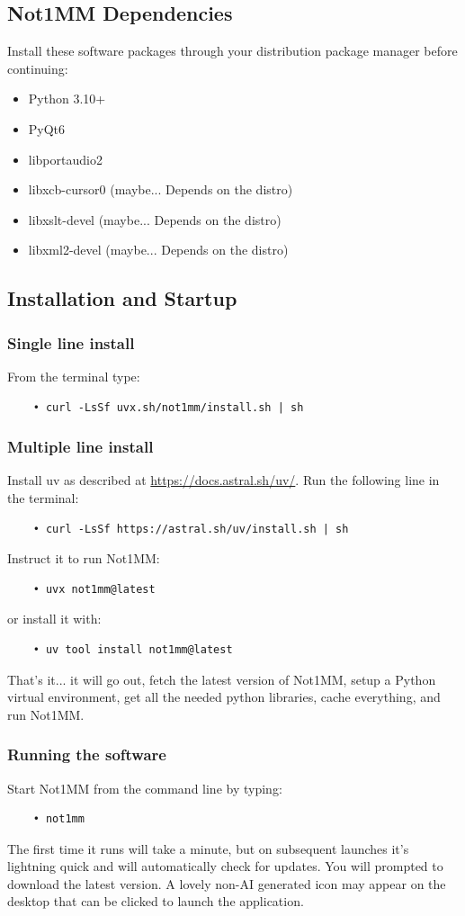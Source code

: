 \documentclass{article}
\begin{document}
\subsection{Not1MM Dependencies}
Install these software packages through your distribution package manager before continuing:
\begin{itemize}
    \item Python 3.10+
    \item PyQt6
    \item libportaudio2
    \item libxcb-cursor0 (maybe... Depends on the distro)
    \item libxslt-devel  (maybe... Depends on the distro)
    \item libxml2-devel  (maybe... Depends on the distro)
\end{itemize}

\subsection{Installation and Startup}

\subsubsection{Single line install}
From the terminal type:
\begin{verbatim}
    • curl -LsSf uvx.sh/not1mm/install.sh | sh
\end{verbatim}
\subsubsection{Multiple line install}
Install uv as described at \url{https://docs.astral.sh/uv/}. Run the following line in the terminal:
\begin{verbatim}
    • curl -LsSf https://astral.sh/uv/install.sh | sh
\end{verbatim}
Instruct it to run Not1MM:
\begin{verbatim}
    • uvx not1mm@latest
\end{verbatim}
or install it with:
\begin{verbatim}
    • uv tool install not1mm@latest
\end{verbatim}

\noindent That's it... it will go out, fetch the latest version of Not1MM, setup a Python virtual environment, get all the needed python libraries, cache everything, and run Not1MM. 
\subsubsection{Running the software}
Start Not1MM from the command line by typing: 
\begin{verbatim}
    • not1mm
\end{verbatim}
The first time it runs will take a minute, but on subsequent launches it's lightning quick and will automatically check for updates. You will prompted to download the latest version. A lovely non-AI generated icon may appear on the desktop that can be clicked to launch the application.
\end{document}

